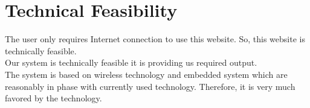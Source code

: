 \section{Technical Feasibility}
\textbullet \hspace{0.2cm} The user only requires Internet connection to use this website. So, this website is technically feasible. \\
\textbullet \hspace{0.2cm} Our system is technically feasible it is providing us required output.\\
\textbullet \hspace{0.2cm} The system is based on wireless technology and embedded system which are reasonably in phase with currently used technology. Therefore, it is very much favored by the technology.


